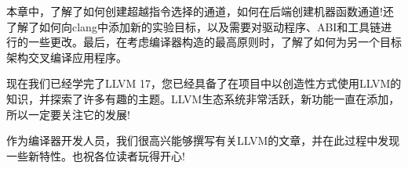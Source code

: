 本章中，了解了如何创建超越指令选择的通道，如何在后端创建机器函数通道!还了解了如何向clang中添加新的实验目标，以及需要对驱动程序、ABI和工具链进行的一些更改。最后，在考虑编译器构造的最高原则时，了解了如何为另一个目标架构交叉编译应用程序。

现在我们已经学完了LLVM 17，您已经具备了在项目中以创造性方式使用LLVM的知识，并探索了许多有趣的主题。LLVM生态系统非常活跃，新功能一直在添加，所以一定要关注它的发展!

作为编译器开发人员，我们很高兴能够撰写有关LLVM的文章，并在此过程中发现一些新特性。也祝各位读者玩得开心!